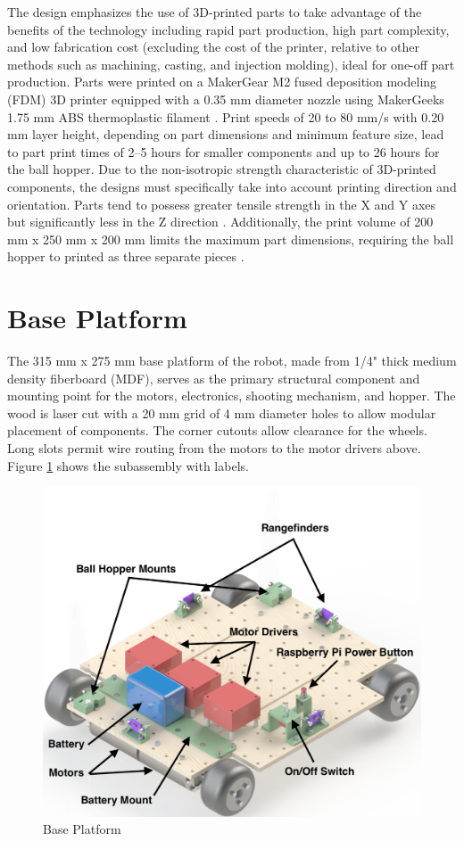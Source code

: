 The design emphasizes the use of 3D-printed parts to take advantage of the benefits of the technology including rapid part production, high part complexity, and low fabrication cost (excluding the cost of the printer, relative to other methods such as machining, casting, and injection molding), ideal for one-off part production. Parts were printed on a MakerGear M2 fused deposition modeling (FDM) 3D printer equipped with a 0.35 mm diameter nozzle using MakerGeeks 1.75 mm ABS thermoplastic filament \cite{makergear_m2}\cite{makergeeks}. Print speeds of 20 to 80 mm/s with 0.20 mm layer height, depending on part dimensions and minimum feature size, lead to part print times of 2--5 hours for smaller components and up to 26 hours for the ball hopper. Due to the non-isotropic strength characteristic of 3D-printed components, the designs must specifically take into account printing direction and orientation. Parts tend to possess greater tensile strength in the X and Y axes but significantly less in the Z direction \cite{3dhubs_orientation}. Additionally, the print volume of 200 mm x 250 mm x 200 mm limits the maximum part dimensions, requiring the ball hopper to printed as three separate pieces \cite{makergear_m2}. 

\section{Base Platform}
The 315 mm x 275 mm base platform of the robot, made from 1/4" thick medium density fiberboard (MDF), serves as the primary structural component and mounting point for the motors, electronics, shooting mechanism, and hopper. The wood is laser cut with a 20 mm grid of 4 mm diameter holes to allow modular placement of components. The corner cutouts allow clearance for the wheels. Long slots permit wire routing from the motors to the motor drivers above. Figure \ref{fig:base_platform} shows the subassembly with labels.

\begin{figure}[H]   %
	\centering \includegraphics[width=6in, height=3.85in, keepaspectratio]{figures/base_platform.png}
	\caption{Base Platform}	\label{fig:base_platform}
\end{figure}

